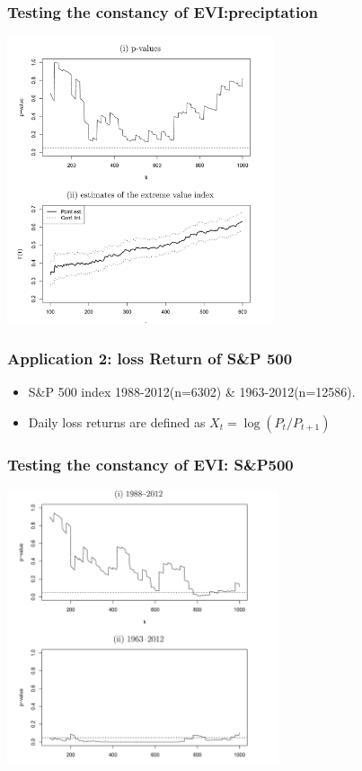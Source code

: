 \documentclass{beamer}
\begin{document}
\begin{frame}
    \frametitle{Testing the constancy of EVI:preciptation}
\begin{center}
    \includegraphics[width=0.59\textwidth]{image-20200429230720801}
\end{center}
    

\end{frame}


\begin{frame}
    \frametitle{Application 2: loss Return of S\&P 500}

   \begin{itemize}
       \item  S\&P 500 index 1988-2012(n=6302) \& 1963-2012(n=12586).
       \bigskip
       \item Daily loss returns are defined as $X_t=\log (P_t/P_{t+1})$
   \end{itemize} 
\end{frame}

\begin{frame}
    \frametitle{Testing the constancy of EVI: S\&P500}
\begin{center}
    \includegraphics[width=0.6\textwidth]{image-20200429230846070}
\end{center}
    

\end{frame}
\end{document}
